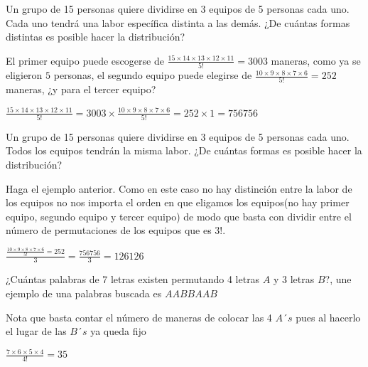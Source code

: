 \documentclass[11pt]{scrartcl}
\begin{document}
\begin{problem}
    Un grupo de 15 personas quiere dividirse en 3 equipos de 5 personas cada uno. Cada uno tendrá una labor específica distinta a las demás. ¿De cuántas formas distintas es posible hacer la distribución?
    \begin{hint}
        El primer equipo puede escogerse de $\frac{15\times 14\times 13\times 12\times 11}{5!}=3003$ maneras, como ya se eligieron $5$ personas, el segundo equipo puede elegirse de $\frac{10\times 9\times 8\times 7\times 6}{5!}=252$ maneras, ¿y para el tercer equipo?
    \end{hint}
    \begin{answer}
        $\frac{15\times 14\times 13\times 12\times 11}{5!}=3003\times \frac{10\times 9\times 8\times 7\times 6}{5!}=252\times 1=756756$
    \end{answer}
    \end{problem}
    \vspace*{0.1cm}
    \begin{problem}
        Un grupo de 15 personas quiere dividirse en 3 equipos de 5 personas cada uno. Todos los equipos tendrán la misma labor. ¿De cuántas formas es posible hacer la distribución?
        \begin{hint}
            Haga el ejemplo anterior. Como en este caso no hay distinción entre la labor de los equipos no nos importa el orden en que eligamos los equipos(no hay primer equipo, segundo equipo y tercer equipo) de modo que basta con dividir entre el número de permutaciones de los equipos que es $3!$.
        
        \end{hint}
        \begin{answer}
            $\frac{\frac{10\times 9\times 8\times 7\times 6}{5!}=252}{3}=\frac{756756}{3}=126126$
        \end{answer}
    \end{problem}
    \vspace*{0.1cm}
   \begin{problem}
       ¿Cuántas palabras de 7 letras existen permutando 4 letras $A$ y $3$ letras $B$?, une ejemplo de una palabras buscada es $AABBAAB$
       \begin{hint}
           Nota que basta contar  el número de maneras de colocar las 4 $A´s$ pues al hacerlo el lugar de las $B´s$ ya queda fijo
       \end{hint}
       \begin{answer}
           $\frac{7\times 6\times 5\times 4}{4!}=35$
       \end{answer}
   \end{problem}
   \vspace{0.1cm}
   
\end{document}
